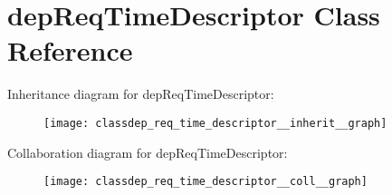 \hypertarget{classdep_req_time_descriptor}{}\section{dep\+Req\+Time\+Descriptor Class Reference}
\label{classdep_req_time_descriptor}


Inheritance diagram for dep\+Req\+Time\+Descriptor\+:
\nopagebreak
\begin{figure}[H]
\begin{center}
\leavevmode
\texttt{[image: classdep\_req\_time\_descriptor\_\_inherit\_\_graph]}
\end{center}
\end{figure}


Collaboration diagram for dep\+Req\+Time\+Descriptor\+:
\nopagebreak
\begin{figure}[H]
\begin{center}
\leavevmode
\texttt{[image: classdep\_req\_time\_descriptor\_\_coll\_\_graph]}
\end{center}
\end{figure}
